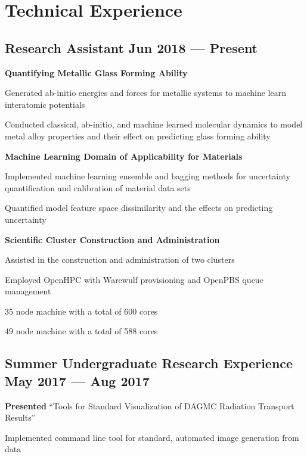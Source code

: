 \section{Technical Experience}

\subsection{{Research Assistant \hfill Jun 2018 --- Present}}
\begin{zitemize}
\item[] \textbf{Quantifying Metallic Glass Forming Ability}
    \begin{zitemize}
    \item Generated ab-initio energies and forces for metallic systems to machine learn interatomic potentials
    \item Conducted classical, ab-initio, and machine learned molecular dynamics to model metal alloy properties and their effect on predicting glass forming ability
    \end{zitemize}
\item[] \textbf{Machine Learning Domain of Applicability for Materials}
    \begin{zitemize}
    \item Implemented machine learning ensemble and bagging methods for uncertainty quantification and calibration of material data sets
    \item Quantified model feature space dissimilarity and the effects on predicting uncertainty
    \end{zitemize}
\item[] \textbf{Scientific Cluster Construction and Administration}
    \begin{zitemize}
    \item Assisted in the construction and administration of two clusters
    \item Employed OpenHPC with Warewulf provisioning and OpenPBS queue management
    \begin{zitemize}
        \item 35 node machine with a total of 600 cores
        \item 49 node machine with a total of 588 cores
    \end{zitemize}
    \end{zitemize}
\end{zitemize}

\subsection{{Summer Undergraduate Research Experience \hfill May 2017 --- Aug 2017}}
\begin{zitemize}
\item \textbf{Presented} ``Tools for Standard Visualization of DAGMC Radiation Transport Results''
\item Implemented command line tool for standard, automated image generation from data
\end{zitemize}

